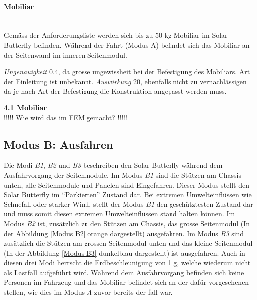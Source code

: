   \paragraph{Mobiliar}\mbox{}\\
  Gemäss der Anforderungsliste werden sich bis zu 50 kg Mobiliar im Solar Butterfly befinden. Während der Fahrt (Modus A) befindet sich das Mobiliar an der Seitenwand im inneren Seitenmodul.

  \emph{Ungenauigkeit} 0.4, da grosse ungewissheit bei der Befestigung des Mobiliars. Art der Einleitung ist unbekannt.
  \emph{Auswirkung} 20, ebenfalls nicht zu vernachlässigen da je nach Art der Befestigung die Konstruktion angepasst werden muss.
  \begin{description}
    \item \textbf{4.1 Mobiliar}\\
    !!!!! Wie wird das im FEM gemacht? !!!!!
  \end{description}


\subsection{Modus B: Ausfahren}
Die Modi \emph{B1}, \emph{B2} und \emph{B3} beschreiben den Solar Butterfly während dem Ausfahrvorgang der Seitenmodule. Im Modus \emph{B1} sind die Stützen am Chassis unten, alle Seitenmodule und Panelen sind Eingefahren. Dieser Modus stellt den Solar Butterfly im ``Parkierten'' Zustand dar. Bei extremen Umwelteinflüssen wie Schnefall oder starker Wind, stellt der Modus \emph{B1} den geschütztesten Zustand dar und muss somit diesen extremen Umwelteinflüssen stand halten können. Im Modus \emph{B2} ist, zusätzlich zu den Stützen am Chassis, das grosse Seitenmodul (In der Abbildung \ref{Modus B2} orange dargestellt) ausgefahren. Im Modus \emph{B3} sind zusätzlich die Stützen am grossen Seitenmodul unten und das kleine Seitenmodul (In der Abbildung \ref{Modus B3} dunkelblau dargestellt) ist ausgefahren.
Auch in diesen drei Modi herrscht die Erdbeschleunigung von 1 g, welche wiederum nicht als Lastfall aufgeführt wird. Während dem Ausfahrvorgang befinden sich keine Personen im Fahrzeug und das Mobiliar befindet sich an der dafür vorgesehenen stellen, wie dies im Modus \emph{A} zuvor bereits der fall war.

